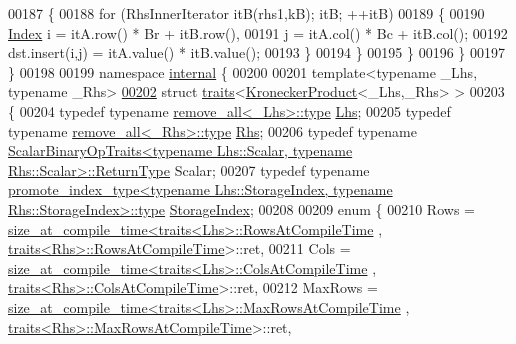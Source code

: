 \begin{DoxyCode}
00187       \{
00188         \textcolor{keywordflow}{for} (RhsInnerIterator itB(rhs1,kB); itB; ++itB)
00189         \{
00190           \hyperlink{namespace_eigen_a62e77e0933482dafde8fe197d9a2cfde}{Index} i = itA.row() * Br + itB.row(),
00191                 j = itA.col() * Bc + itB.col();
00192           dst.insert(i,j) = itA.value() * itB.value();
00193         \}
00194       \}
00195     \}
00196   \}
00197 \}
00198 
00199 \textcolor{keyword}{namespace }\hyperlink{namespaceinternal}{internal} \{
00200 
00201 \textcolor{keyword}{template}<\textcolor{keyword}{typename} \_Lhs, \textcolor{keyword}{typename} \_Rhs>
\hyperlink{struct_eigen_1_1internal_1_1traits_3_01_kronecker_product_3_01___lhs_00_01___rhs_01_4_01_4}{00202} \textcolor{keyword}{struct }\hyperlink{struct_eigen_1_1internal_1_1traits}{traits}<\hyperlink{class_eigen_1_1_kronecker_product}{KroneckerProduct}<\_Lhs,\_Rhs> >
00203 \{
00204   \textcolor{keyword}{typedef} \textcolor{keyword}{typename} \hyperlink{group___sparse_core___module}{remove\_all<\_Lhs>::type} \hyperlink{group___sparse_core___module}{Lhs};
00205   \textcolor{keyword}{typedef} \textcolor{keyword}{typename} \hyperlink{group___sparse_core___module}{remove\_all<\_Rhs>::type} \hyperlink{group___sparse_core___module}{Rhs};
00206   \textcolor{keyword}{typedef} \textcolor{keyword}{typename} 
      \hyperlink{group___core___module_struct_eigen_1_1_scalar_binary_op_traits}{ScalarBinaryOpTraits<typename Lhs::Scalar, typename Rhs::Scalar>::ReturnType}
       Scalar;
00207   \textcolor{keyword}{typedef} \textcolor{keyword}{typename} 
      \hyperlink{struct_eigen_1_1internal_1_1conditional}{promote\_index\_type<typename Lhs::StorageIndex, typename Rhs::StorageIndex>::type}
       \hyperlink{struct_eigen_1_1internal_1_1conditional}{StorageIndex};
00208 
00209   \textcolor{keyword}{enum} \{
00210     Rows = \hyperlink{struct_eigen_1_1internal_1_1size__at__compile__time}{size\_at\_compile\_time<traits<Lhs>::RowsAtCompileTime}
      , \hyperlink{struct_eigen_1_1internal_1_1traits}{traits<Rhs>::RowsAtCompileTime}>::ret,
00211     Cols = \hyperlink{struct_eigen_1_1internal_1_1size__at__compile__time}{size\_at\_compile\_time<traits<Lhs>::ColsAtCompileTime}
      , \hyperlink{struct_eigen_1_1internal_1_1traits}{traits<Rhs>::ColsAtCompileTime}>::ret,
00212     MaxRows = \hyperlink{struct_eigen_1_1internal_1_1size__at__compile__time}{size\_at\_compile\_time<traits<Lhs>::MaxRowsAtCompileTime}
      , \hyperlink{struct_eigen_1_1internal_1_1traits}{traits<Rhs>::MaxRowsAtCompileTime}>::ret,

\end{DoxyCode}
